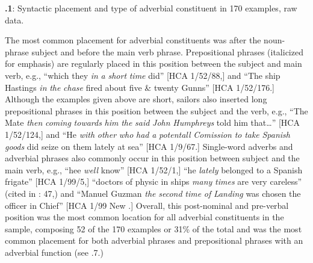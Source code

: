   
 

 

\textbf{.1}: Syntactic placement and type of adverbial constituent in 170 examples, raw data.

The most common placement for adverbial constituents was after the noun-phrase subject and before the main verb phrase. Prepositional phrases (italicized for emphasis) are regularly placed in this position between the subject and main verb, e.g., “which they \textit{in} \textit{a} \textit{short} \textit{time} did” [HCA 1/52/88,] and “The ship Hastings \textit{in} \textit{the} \textit{chase} fired about five \& twenty Gunns” [HCA 1/52/176.] Although the examples given above are short, sailors also inserted long prepositional phrases in this position between the subject and the verb, e.g., “The Mate \textit{then} \textit{coming} \textit{towards} \textit{him} \textit{the} \textit{said} \textit{John} \textit{Humphreys} told him that…” [HCA 1/52/124,] and “He \textit{with} \textit{other} \textit{who} \textit{had} \textit{a} \textit{potentall} \textit{Comission} \textit{to} \textit{take} \textit{Spanish} \textit{goods} did seize on them lately at sea” [HCA 1/9/67.] Single-word adverbs and adverbial phrases also commonly occur in this position between subject and the main verb, e.g., “hee \textit{well} know” [HCA 1/52/1,] “he \textit{lately} belonged to a Spanish frigate” [HCA 1/99/5,] “doctors of physic in ships \textit{many} \textit{times} are very careless” (cited in \citealt{Brown2011}: 47,) and “Manuel Guzman \textit{the} \textit{second} \textit{time} \textit{of} \textit{Landing} was chosen the officer in Chief” [HCA 1/99 New \citealt{Providence1722}.] Overall, this post-nominal and pre-verbal position was the most common location for all adverbial constituents in the sample, composing 52 of the 170 examples or 31\% of the total and was the most common placement for both adverbial phrases and prepositional phrases with an adverbial function (see .7.) 

